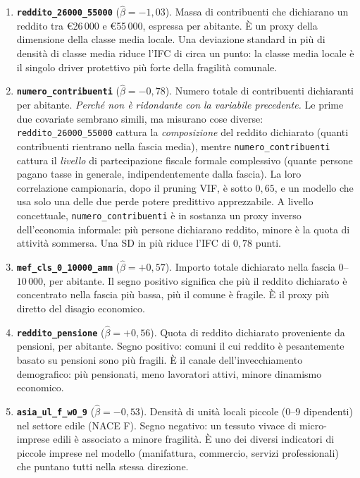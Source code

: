 \documentclass[11pt,a4paper]{article}
\begin{document}
\begin{enumerate}[leftmargin=2em]
  \item \textbf{\texttt{reddito\_26000\_55000}} (\(\hat\beta = -1{,}03\)).
    Massa di contribuenti che dichiarano un reddito tra
    \euro{26\,000} e \euro{55\,000}, espressa per abitante. \`E un
    proxy della dimensione della classe media locale. Una deviazione
    standard in pi\`u di densit\`a di classe media riduce l'IFC di
    circa un punto: la classe media locale \`e il singolo driver
    protettivo pi\`u forte della fragilit\`a comunale.

  \item \textbf{\texttt{numero\_contribuenti}} (\(\hat\beta = -0{,}78\)).
    Numero totale di contribuenti dichiaranti per abitante.
    \emph{Perch\'e non \`e ridondante con la variabile precedente.}
    Le prime due covariate sembrano simili, ma misurano cose diverse:
    \texttt{reddito\_26000\_55000} cattura la \emph{composizione} del
    reddito dichiarato (quanti contribuenti rientrano nella fascia
    media), mentre \texttt{numero\_contribuenti} cattura il
    \emph{livello} di partecipazione fiscale formale
    complessivo (quante persone pagano tasse in generale,
    indipendentemente dalla fascia). La loro correlazione campionaria,
    dopo il pruning VIF, \`e sotto $0{,}65$, e un modello che usa
    solo una delle due perde potere predittivo apprezzabile. A
    livello concettuale, \texttt{numero\_contribuenti} \`e in sostanza
    un proxy inverso dell'economia informale: pi\`u persone
    dichiarano reddito, minore \`e la quota di attivit\`a sommersa.
    Una SD in pi\`u riduce l'IFC di $0{,}78$ punti.

  \item \textbf{\texttt{mef\_cls\_0\_10000\_amm}} (\(\hat\beta = +0{,}57\)).
    Importo totale dichiarato nella fascia
    \texteuro\(0\)--\texteuro\(10\,000\), per abitante. Il segno
    positivo significa che pi\`u il reddito dichiarato \`e
    concentrato nella fascia pi\`u bassa, pi\`u il comune \`e
    fragile. \`E il proxy pi\`u diretto del disagio economico.

  \item \textbf{\texttt{reddito\_pensione}} (\(\hat\beta = +0{,}56\)).
    Quota di reddito dichiarato proveniente da pensioni, per
    abitante. Segno positivo: comuni il cui reddito \`e
    pesantemente basato su pensioni sono pi\`u fragili. \`E il
    canale dell'invecchiamento demografico: pi\`u pensionati, meno
    lavoratori attivi, minore dinamismo economico.

  \item \textbf{\texttt{asia\_ul\_f\_w0\_9}} (\(\hat\beta = -0{,}53\)).
    Densit\`a di unit\`a locali piccole (0--9 dipendenti) nel
    settore edile (NACE F). Segno negativo: un tessuto vivace di
    micro-imprese edili \`e associato a minore fragilit\`a. \`E uno
    dei diversi indicatori di piccole imprese nel modello
    (manifattura, commercio, servizi professionali) che puntano
    tutti nella stessa direzione.
\end{enumerate}
\end{document}
